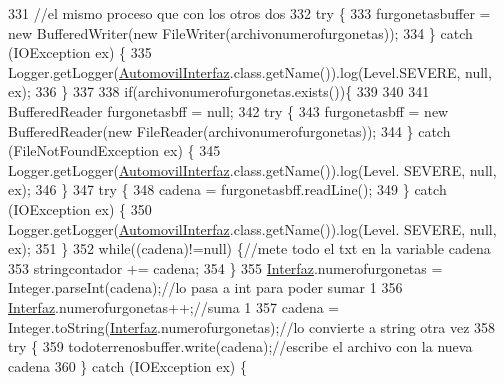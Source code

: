 \begin{DoxyCode}
331             \textcolor{comment}{//el mismo proceso que con los otros dos}
332                 \textcolor{keywordflow}{try} \{
333                     furgonetasbuffer = \textcolor{keyword}{new} BufferedWriter(\textcolor{keyword}{new} FileWriter(archivonumerofurgonetas));
334                 \} \textcolor{keywordflow}{catch} (IOException ex) \{
335                     Logger.getLogger(\mbox{\hyperlink{classejercicio2_1_1_automovil_interfaz_a0ebeee030ec43693c371da3b68222644}{AutomovilInterfaz}}.class.getName()).log(Level.SEVERE, 
      null, ex);
336                 \}
337             
338             \textcolor{keywordflow}{if}(archivonumerofurgonetas.exists())\{
339             
340                 
341                 BufferedReader furgonetasbff = null;
342                     \textcolor{keywordflow}{try} \{
343                         furgonetasbff = \textcolor{keyword}{new} BufferedReader(\textcolor{keyword}{new} FileReader(archivonumerofurgonetas));
344                     \} \textcolor{keywordflow}{catch} (FileNotFoundException ex) \{
345                         Logger.getLogger(\mbox{\hyperlink{classejercicio2_1_1_automovil_interfaz_a0ebeee030ec43693c371da3b68222644}{AutomovilInterfaz}}.class.getName()).log(Level.
      SEVERE, null, ex);
346                     \}
347                     \textcolor{keywordflow}{try} \{
348                         cadena = furgonetasbff.readLine();
349                     \} \textcolor{keywordflow}{catch} (IOException ex) \{
350                         Logger.getLogger(\mbox{\hyperlink{classejercicio2_1_1_automovil_interfaz_a0ebeee030ec43693c371da3b68222644}{AutomovilInterfaz}}.class.getName()).log(Level.
      SEVERE, null, ex);
351                     \}
352                 \textcolor{keywordflow}{while}((cadena)!=null) \{\textcolor{comment}{//mete todo el txt en la variable cadena}
353                         stringcontador += cadena;
354                     \}
355                 \mbox{\hyperlink{namespace_interfaz}{Interfaz}}.numerofurgonetas = Integer.parseInt(cadena);\textcolor{comment}{//lo pasa a int para poder
       sumar 1}
356                 \mbox{\hyperlink{namespace_interfaz}{Interfaz}}.numerofurgonetas++;\textcolor{comment}{//suma 1}
357                 cadena = Integer.toString(\mbox{\hyperlink{namespace_interfaz}{Interfaz}}.numerofurgonetas);\textcolor{comment}{//lo convierte a string otra
       vez}
358                     \textcolor{keywordflow}{try} \{
359                         todoterrenosbuffer.write(cadena);\textcolor{comment}{//escribe el archivo con la nueva cadena}
360                     \} \textcolor{keywordflow}{catch} (IOException ex) \{

\end{DoxyCode}
